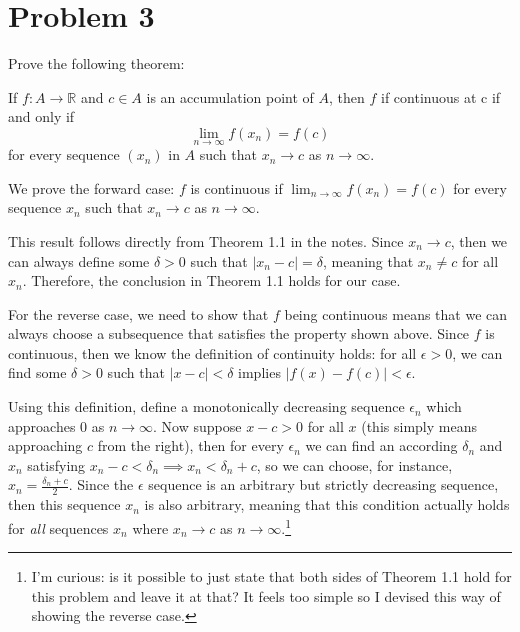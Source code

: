 \documentclass[10pt]{article}
\newcommand{\R}{\mathbb R}
\begin{document}
	\pagebreak

	\section*{Problem 3}
	Prove the following theorem:
	\begin{theorem}
		If $f: A \to \R$ and $c \in A$ is an accumulation point of $A$, then $f$ if continuous at c if and only
		if 
		\[
			\lim_{n \to \infty} f(x_n) = f(c)
		\] 
		for every sequence $(x_n)$ in $A$ such that $x_n \to c$ as $n \to \infty$.

	\end{theorem}
		\begin{solution}
			We prove the forward case: $f$ is continuous if $\lim_{n \to \infty} f(x_n) = f(c)$ for every 
			sequence $x_n$ such that $x_n \to c$ as $n \to \infty$. 

			This result follows directly from Theorem 1.1 in the notes. Since $x_n \to c$, then we can always 
			define some $\delta> 0$ such that $|x_n - c| = \delta$, meaning that $x_n \neq c$ for all $x_n$. 
			Therefore, the conclusion in Theorem 1.1 holds for our case. 

			For the reverse case, we need to show that $f$ being continuous means that we can always choose a 
			subsequence that satisfies the property shown above. Since $f$ is continuous, then we know the 
			definition of continuity holds: for all $\epsilon > 0$, we can find some $\delta > 0$ such that 
			$|x - c| < \delta$ implies $|f(x) - f(c)| < \epsilon$. 

			Using this definition, define a monotonically
			decreasing sequence $\epsilon_n$ which approaches 0 as $n \to \infty$.
			Now suppose $x - c > 0$ for all $x$ (this simply
			means approaching $c$ from the right), then for every $\epsilon_n$ we can find an according 
			$\delta_n$ and $x_n$ satisfying $x_n - c < \delta_n \implies x_n < \delta_n + c$, so we can choose, 
			for instance, $x_n = \frac{\delta_n + c}{2}$. Since the $\epsilon$ sequence is an arbitrary but 
			strictly decreasing sequence, then this sequence $x_n$ is also arbitrary, meaning that this condition
			actually holds for \textit{all} sequences $x_n$ where $x_n \to c$ as $n \to \infty$.\footnote{I'm 
				curious: is it possible to just state that both sides of Theorem 1.1 hold for this problem and
			leave it at that? It feels too simple so I devised this way of showing the reverse case.}
		\end{solution}
	\pagebreak
\end{document}
